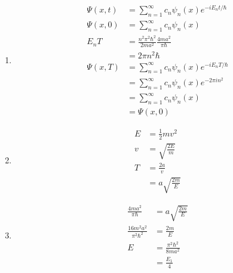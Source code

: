 \documentclass{article}
\begin{document}
\begin{enumerate}
  \item

        \begin{align*}
          \Psi(x, t) & = \sum_{n = 1}^\infty c_n \psi_n(x) e^{-i E_n t / \hbar}      \\
          \Psi(x, 0) & = \sum_{n = 1}^\infty c_n \psi_n(x)                           \\
          E_n T      & = \frac{n^2 \pi^2 \hbar^2}{2 m a^2} \frac{4 m a^2}{\pi \hbar} \\
                     & = 2 \pi n^2 \hbar                                             \\
          \Psi(x, T) & = \sum_{n = 1}^\infty c_n \psi_n(x) e^{-i E_n T / \hbar}      \\
                     & = \sum_{n = 1}^\infty c_n \psi_n(x) e^{-2 \pi i n^2}          \\
                     & = \sum_{n = 1}^\infty c_n \psi_n(x)                           \\
                     & = \Psi(x, 0)
        \end{align*}

  \item

        \begin{align*}
          E & = \frac{1}{2} m v^2      \\
          v & = \sqrt{\frac{2 E}{m}}   \\
          T & = \frac{2 a}{v}          \\
            & = a \sqrt{\frac{2 m}{E}}
        \end{align*}

  \item

        \begin{align*}
          \frac{4 m a^2}{\pi \hbar}        & = a \sqrt{\frac{2 m}{E}}        \\
          \frac{16 m^2 a^2}{\pi^2 \hbar^2} & = \frac{2 m}{E}                 \\
          E                                & = \frac{\pi^2 \hbar^2}{8 m a^2} \\
                                           & = \frac{E_1}{4}
        \end{align*}
\end{enumerate}

\subsection{}
\end{document}
